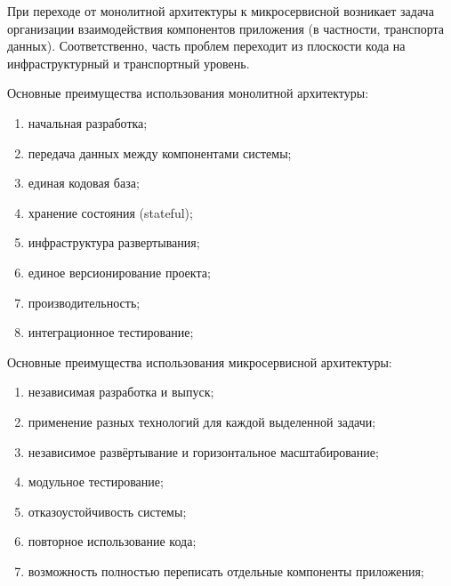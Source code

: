 
При переходе от монолитной архитектуры к микросервисной возникает задача организации взаимодействия компонентов приложения (в частности, транспорта данных). Соответственно, часть проблем переходит из плоскости кода на инфраструктурный и транспортный уровень.


Основные преимущества использования монолитной архитектуры:

\begin{enumerate}[label*=\arabic*)]
	\item начальная разработка;
	\item передача данных между компонентами системы;
	\item единая кодовая база; %
	\item хранение состояния (stateful);
	\item инфраструктура развертывания; %
	\item единое версионирование проекта;
	\item производительность; %
	\item интеграционное тестирование;
\end{enumerate}

Основные преимущества использования микросервисной архитектуры:

\begin{enumerate}[label*=\arabic*)]
	\item независимая разработка и выпуск; %
	\item применение разных технологий для каждой выделенной задачи;
	\item независимое развёртывание и горизонтальное масштабирование; %
	\item модульное тестирование; %
	\item отказоустойчивость системы; %
	\item повторное использование кода; %
	\item возможность полностью переписать отдельные компоненты приложения; %
\end{enumerate}

